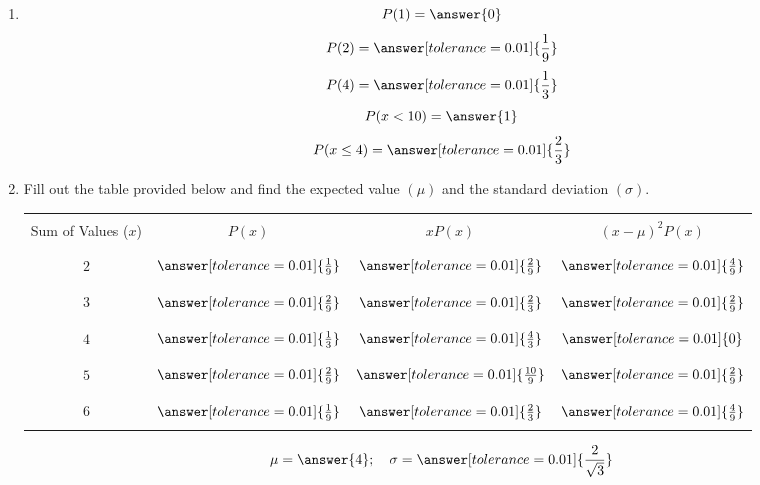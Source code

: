 \documentclass{ximera}
\begin{document}
\begin{problem}
\begin{enumerate}
    
\item $$P(1)=\answer{0}$$ $$P(2)=\answer[tolerance=0.01]{\frac{1}{9}}$$ $$P(4)=\answer[tolerance=0.01]{\frac{1}{3}}$$ $$P(x<10)=\answer{1}$$ $$P(x\leq 4)=\answer[tolerance=0.01]{\frac{2}{3}}$$


\item Fill out the table provided below and find the expected value $(\mu)$ and the standard deviation $(\sigma)$.

\begin{center}
\begin{tabular}{|c|c|c|c|}
 \hline
 && &   \\
 Sum of Values ($x$) & $P(x)$& $xP(x)$ &$(x-\mu)^2P(x)$ \\
 && &   \\
  \hline
  && & \\
 \quad$2$\quad&$\answer[tolerance=0.01]{\frac{1}{9}}$&$\answer[tolerance=0.01]{\frac{2}{9}}$&$\answer[tolerance=0.01]{\frac{4}{9}}$ \\
  &&& \\
 \hline
  &&& \\
 \quad $3$&$\answer[tolerance=0.01]{\frac{2}{9}}$&$\answer[tolerance=0.01]{\frac{2}{3}}$ & $\answer[tolerance=0.01]{\frac{2}{9}}$ \\
  &&& \\
 \hline
  &&& \\
  \quad $4$&$\answer[tolerance=0.01]{\frac{1}{3}}$& $\answer[tolerance=0.01]{\frac{4}{3}}$ &$\answer[tolerance=0.01]{0}$ \\
  &&& \\
 \hline
  & &&\\
 \quad $5$& $\answer[tolerance=0.01]{\frac{2}{9}}$&$\answer[tolerance=0.01]{\frac{10}{9}}$  & $\answer[tolerance=0.01]{\frac{2}{9}}$\\
  &&&\\
 \hline
  & &&\\
 \quad $6$&$\answer[tolerance=0.01]{\frac{1}{9}}$ & $\answer[tolerance=0.01]{\frac{2}{3}}$ & $\answer[tolerance=0.01]{\frac{4}{9}}$\\
  &&&\\
 \hline
\end{tabular}
\end{center}
\vskip 0.5in
$$\mu=\answer{4};\quad \sigma =\answer[tolerance=0.01]{\frac{2}{\sqrt{3}}}$$
\end{enumerate}

\end{problem}
\end{document}
